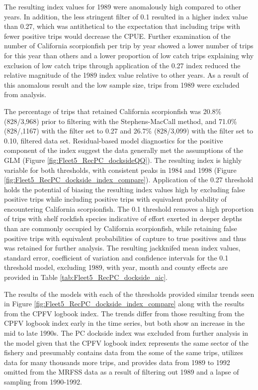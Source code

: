 \documentclass[12pt,]{article}
\begin{document}
The resulting index values for 1989 were anomalously high compared to
other years. In addition, the less stringent filter of 0.1 resulted in a
higher index value than 0.27, which was antithetical to the expectation
that including trips with fewer positive trips would decrease the CPUE.
Further examination of the number of California scorpionfish per trip by
year showed a lower number of trips for this year than others and a
lower proportion of low catch trips explaining why exclusion of low
catch trips through application of the 0.27 index reduced the relative
magnitude of the 1989 index value relative to other years. As a result
of this anomalous result and the low sample size, trips from 1989 were
excluded from analysis.

The percentage of trips that retained California scorpionfish was 20.8\%
(828/3,968) prior to filtering with the Stephens-MacCall method, and
71.0\% (828/,1167) with the filter set to 0.27 and 26.7\% (828/3,099)
with the filter set to 0.10, filtered data set. Residual-based model
diagnostics for the positive component of the index suggest the data
generally met the assumptions of the GLM (Figure
\ref{fig:Fleet5_RecPC_docksideQQ}). The resulting index is highly
variable for both thresholds, with consistent peaks in 1984 and 1998
(Figure \ref{fig:Fleet5_RecPC_dockside_index_compare}). Application of
the 0.27 threshold holds the potential of biasing the resulting index
values high by excluding false positive trips while including positive
trips with equivalent probability of encountering California
scorpionfish. The 0.1 threshold removes a high proportion of trips with
shelf rockfish species indicative of effort exerted in deeper depths
than are commonly occupied by California scorpionfish, while retaining
false positive trips with equivalent probabilities of capture to true
positives and thus was retained for further analysis. The resulting
jackknifed mean index values, standard error, coefficient of variation
and confidence intervals for the 0.1 threshold model, excluding 1989,
with year, month and county effects are provided in Table
\ref{tab:Fleet5_RecPC_dockside_aic}.

The results of the models with each of the thresholds provided similar
trends seen in Figure \ref{fig:Fleet5_RecPC_dockside_index_compare}
along with the results from the CPFV logbook index. The trends differ
from those resulting from the CPFV logbook index early in the time
series, but both show an increase in the mid to late 1990s. The PC
dockside index was excluded from further analysis in the model given
that the CPFV logbook index represents the same sector of the fishery
and presumably contains data from the some of the same trips, utilizes
data for many thousands more trips, and provides data from 1989 to 1992
omitted from the MRFSS data as a result of filtering out 1989 and a
lapse of sampling from 1990-1992.
\end{document}
